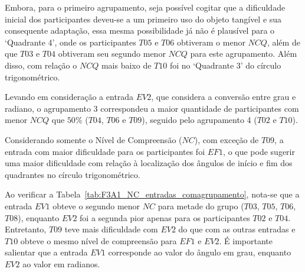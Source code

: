 Embora, para o primeiro agrupamento, seja possível cogitar que a dificuldade inicial dos participantes deveu-se a um primeiro uso do objeto tangível e sua consequente adaptação, essa mesma possibilidade já não é plausível para o `Quadrante 4', onde os participantes $T05$ e $T06$ obtiveram o menor $NCQ$, além de que $T03$ e $T04$ obtiveram seu segundo menor $NCQ$ para este agrupamento. Além disso, com relação o $NCQ$ mais baixo de $T10$ foi no `Quadrante 3' do círculo trigonométrico.

Levando em consideração a entrada $EV2$, que considera a conversão entre grau e radiano, o agrupamento 3 correspondeu a maior quantidade de participantes com menor $NCQ$ que $50\%$ ($T04$, $T06$ e $T09$), seguido pelo agrupamento 4 ($T02$ e $T10$).

Considerando somente o Nível de Compreensão ($NC$), com exceção de $T09$, a entrada com maior dificuldade para os participantes foi $EF1$, o que pode sugerir uma maior dificuldade com relação à localização dos ângulos de início e fim dos quadrantes no círculo trigonométrico.

Ao verificar a Tabela~\ref{tab:F3A1_NC_entradas_comagrupamento}, nota-se que a entrada $EV1$ obteve o segundo menor $NC$ para metade do grupo ($T03$, $T05$, $T06$, $T08$), enquanto $EV2$ foi a segunda pior apenas para os participantes $T02$ e $T04$. Entretanto, $T09$ teve mais dificuldade com $EV2$ do que com as outras entradas e $T10$ obteve o mesmo nível de compreensão para $EF1$ e $EV2$. É importante salientar que a entrada $EV1$ corresponde ao valor do ângulo em grau, enquanto $EV2$ ao valor em radianos.

